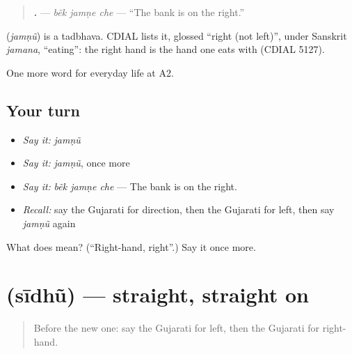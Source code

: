 \begin{quote}
\textbf{  .} — \emph{bẽk jamṇe che} — \textquotedblleft{}The bank is on the right.\textquotedblright{}
\end{quote}

\begin{cousinweb}
\textbf{} (\emph{jamṇũ}) is a tadbhava. CDIAL lists it, glossed \textquotedblleft{}right (not left)\textquotedblright{}, under Sanskrit \emph{jamana}, \textquotedblleft{}eating\textquotedblright{}: the right hand is the hand one eats with (CDIAL 5127).
\end{cousinweb}

\begin{grammarlens}[title={What you've built}]
One more word for everyday life at A2.
\end{grammarlens}

\subsection*{Your turn}
\begin{itemize}
\raggedright
  \item \emph{Say it:} \emph{jamṇũ}
  \item \emph{Say it:} \emph{jamṇũ}, once more
  \item \emph{Say it:} \emph{bẽk jamṇe che} — The bank is on the right.
  \item \emph{Recall:} say the Gujarati for direction, then the Gujarati for left, then say \emph{jamṇũ} again
\end{itemize}

\begin{tcolorbox}[breakable,colback=teal!4,colframe=teal!35!black,title={Before you move on}]
What does  mean? (\textquotedblleft{}Right-hand, right\textquotedblright{}.) Say it once more.
\end{tcolorbox}
\section[\texorpdfstring{\gu{સીધું} (sīdhũ)}{સીધું (sīdhũ)}]{ (sīdhũ) — straight, straight on}

\label{lesson:GU-C193-sidhu}



\begin{quote}
Before the new one: say the Gujarati for left, then the Gujarati for right-hand.
\end{quote}

